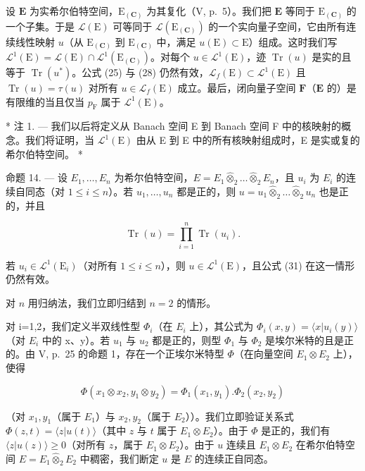 设 \(\mathbf{E}\) 为实希尔伯特空间，\(\mathrm{E}_{(\mathbf{C})}\) 为其复化（V, p.~5）。我们把 \(\mathbf{E}\) 等同于 \(\mathrm{E}_{(\mathbf{C})}\) 的一个子集。于是 \(\mathcal{L}(\mathrm{E})\) 可等同于 \(\mathcal{L}(\mathrm{E}_{(\mathbf{C})})\) 的一个实向量子空间，它由所有连续线性映射 \(u\)（从 \(\mathrm{E}_{(\mathbf{C})}\) 到 \(\mathrm{E}_{(\mathbf{C})}\) 中，满足 \(u(\mathrm{E}) \subset \mathrm{E}\)）组成。这时我们写 \(\mathcal{L}^1(\mathrm{E}) = \mathcal{L}(\mathrm{E}) \cap \mathcal{L}^1(\mathrm{E}_{(\mathbf{C})})\)。对每个 \(u \in \mathcal{L}^1(\mathrm{E})\)，迹 \(\operatorname{Tr}(u)\) 是实的且等于 \(\operatorname{Tr}(u^*)\)。公式 (25) 与 (28) 仍然有效，\(\mathcal{L}_f(\mathrm{E}) \subset \mathcal{L}^1(\mathrm{E})\) 且 \(\operatorname{Tr}(u) = \tau(u)\) 对所有 \(u \in \mathcal{L}_f(\mathrm{E})\) 成立。最后，闭向量子空间 \(\mathbf{F}\)（\(\mathbf{E}\) 的）是有限维的当且仅当 \(p_{\mathrm{F}}\) 属于 \(\mathcal{L}^1(\mathrm{E})\)。

* 注 1. --- 我们以后将定义从 Banach 空间 E 到 Banach 空间 F 中的核映射的概念。我们将证明，当 \(\mathcal{L}^1 (\mathrm{E})\) 由从 E 到 E 中的所有核映射组成时，E 是实或复的希尔伯特空间。 *

命题 14. --- 设 \(E_{1}, \ldots, E_{n}\) 为希尔伯特空间，\(E = E_{1} \hat{\otimes}_{2} \ldots \hat{\otimes}_{2} E_{n}\)，且 \(u_{i}\) 为 \(E_{i}\) 的连续自同态（对 \(1 \leqslant i \leqslant n\)）。若 \(u_{1}, \ldots, u_{n}\) 都是正的，则 \(u = u_{1} \hat{\otimes}_{2} \ldots \hat{\otimes}_{2} u_{n}\) 也是正的，并且

\[
\operatorname{Tr} (u) = \prod_ {i = 1} ^ {n} \operatorname{Tr} (u _ {i}).\tag{31}
\]

若 \(u_{i} \in \mathcal{L}^{1}(\mathrm{E}_{i})\)（对所有 \(1 \leqslant i \leqslant n\)），则 \(u \in \mathcal{L}^{1}(\mathrm{E})\)，且公式 (31) 在这一情形仍然有效。

对 \(n\) 用归纳法，我们立即归结到 \(n = 2\) 的情形。

对 i=1,2，我们定义半双线性型 \(\Phi_{i}\)（在 \(E_{i}\) 上），其公式为 \(\Phi_{i}(x,y)=\langle x|u_{i}(y)\rangle\)（对 \(E_{i}\) 中的 x、y）。若 \(u_{1}\) 与 \(u_{2}\) 都是正的，则型 \(\Phi_{1}\) 与 \(\Phi_{2}\) 是埃尔米特的且是正的。由 V, p.~25 的命题 1，存在一个正埃尔米特型 \(\Phi\)（在向量空间 \(E_{1}\otimes E_{2}\) 上），使得

\[
\Phi (x _ {1} \otimes x _ {2}, y _ {1} \otimes y _ {2}) = \Phi_ {1} (x _ {1}, y _ {1}). \Phi_ {2} (x _ {2}, y _ {2})
\]

（对 \(x_{1}, y_{1}\)（属于 \(E_{1}\)）与 \(x_{2}, y_{2}\)（属于 \(E_{2}\)））。我们立即验证关系式 \(\Phi(z, t) = \langle z|u(t) \rangle\)（其中 \(z\) 与 \(t\) 属于 \(E_{1} \otimes E_{2}\)）。由于 \(\Phi\) 是正的，我们有 \(\langle z|u(z) \rangle \geqslant 0\)（对所有 \(z\)，属于 \(E_{1} \otimes E_{2}\)）。由于 \(u\) 连续且 \(E_{1} \otimes E_{2}\) 在希尔伯特空间 \(E = E_{1} \hat{\otimes}_{2} E_{2}\) 中稠密，我们断定 \(u\) 是 \(E\) 的连续正自同态。

